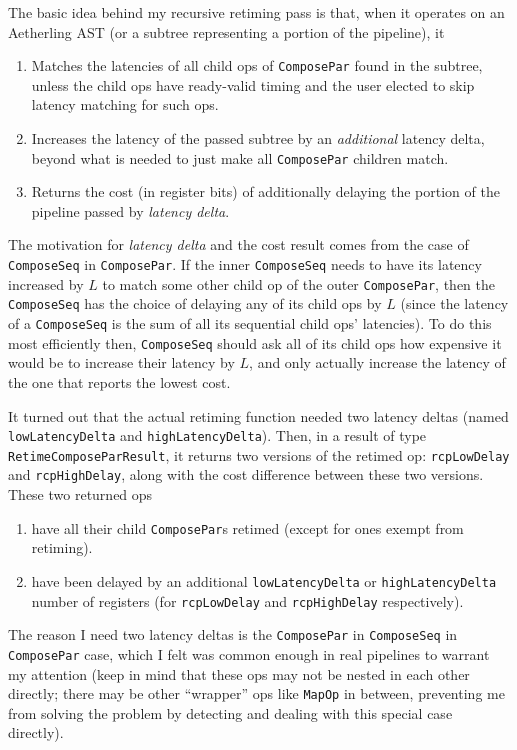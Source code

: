 \documentclass[12pt]{article}
\begin{document}
The basic idea behind my recursive retiming pass is that, when it
operates on an Aetherling AST (or a subtree representing a portion of
the pipeline), it
\begin{enumerate}
\item Matches the latencies of all child ops of \texttt{ComposePar}
  found in the subtree, unless the child ops have ready-valid timing and
  the user elected to skip latency matching for such ops.

\item Increases the latency of the passed subtree by an
  \textit{additional} latency delta, beyond what is needed to just
  make all \texttt{ComposePar} children match.

\item Returns the cost (in register bits) of additionally delaying the
  portion of the pipeline passed by \textit{latency delta}.
\end{enumerate}
The motivation for \textit{latency delta} and the cost result comes
from the case of \texttt{ComposeSeq} in \texttt{ComposePar}. If the
inner \texttt{ComposeSeq} needs to have its latency increased by $L$
to match some other child op of the outer \texttt{ComposePar}, then
the \texttt{ComposeSeq} has the choice of delaying any of its child
ops by $L$ (since the latency of a \texttt{ComposeSeq} is the sum of
all its sequential child ops' latencies). To do this most efficiently
then, \texttt{ComposeSeq} should ask all of its child ops how
expensive it would be to increase their latency by $L$, and only
actually increase the latency of the one that reports the lowest cost.

It turned out that the actual retiming function needed two latency
deltas (named \texttt{lowLatencyDelta} and \texttt{highLatencyDelta}).
Then, in a result of type \texttt{RetimeComposeParResult}, it returns
two versions of the retimed op: \texttt{rcpLowDelay} and
\texttt{rcpHighDelay}, along with the cost difference between these
two versions. These two returned ops
\begin{enumerate}
\item have all their child \texttt{ComposePar}s retimed (except for
ones exempt from retiming).
\item have been delayed by an additional \texttt{lowLatencyDelta} or
\texttt{highLatencyDelta} number of registers (for \texttt{rcpLowDelay}
and \texttt{rcpHighDelay} respectively). %
\end{enumerate}

The reason I need two latency deltas is the \texttt{ComposePar} in
\texttt{ComposeSeq} in \texttt{ComposePar} case, which I felt was
common enough in real pipelines to warrant my attention (keep in mind
that these ops may not be nested in each other directly; there may be
other ``wrapper'' ops like \texttt{MapOp} in between, preventing me
from solving the problem by detecting and dealing with this special
case directly).
\end{document}
